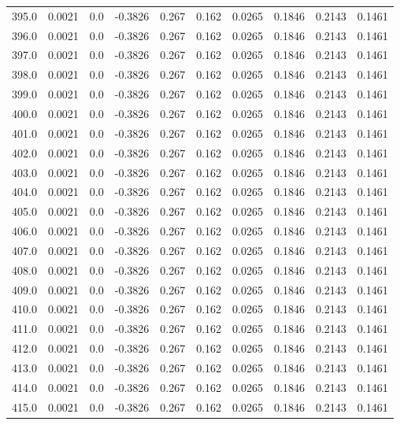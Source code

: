 \begin{longtable}{lrrrrrrrrr}
395.0 & 0.0021 & 0.0 & -0.3826 & 0.267 & 0.162 & 0.0265 & 0.1846 & 0.2143 & 0.1461 \\
396.0 & 0.0021 & 0.0 & -0.3826 & 0.267 & 0.162 & 0.0265 & 0.1846 & 0.2143 & 0.1461 \\
397.0 & 0.0021 & 0.0 & -0.3826 & 0.267 & 0.162 & 0.0265 & 0.1846 & 0.2143 & 0.1461 \\
398.0 & 0.0021 & 0.0 & -0.3826 & 0.267 & 0.162 & 0.0265 & 0.1846 & 0.2143 & 0.1461 \\
399.0 & 0.0021 & 0.0 & -0.3826 & 0.267 & 0.162 & 0.0265 & 0.1846 & 0.2143 & 0.1461 \\
400.0 & 0.0021 & 0.0 & -0.3826 & 0.267 & 0.162 & 0.0265 & 0.1846 & 0.2143 & 0.1461 \\
401.0 & 0.0021 & 0.0 & -0.3826 & 0.267 & 0.162 & 0.0265 & 0.1846 & 0.2143 & 0.1461 \\
402.0 & 0.0021 & 0.0 & -0.3826 & 0.267 & 0.162 & 0.0265 & 0.1846 & 0.2143 & 0.1461 \\
403.0 & 0.0021 & 0.0 & -0.3826 & 0.267 & 0.162 & 0.0265 & 0.1846 & 0.2143 & 0.1461 \\
404.0 & 0.0021 & 0.0 & -0.3826 & 0.267 & 0.162 & 0.0265 & 0.1846 & 0.2143 & 0.1461 \\
405.0 & 0.0021 & 0.0 & -0.3826 & 0.267 & 0.162 & 0.0265 & 0.1846 & 0.2143 & 0.1461 \\
406.0 & 0.0021 & 0.0 & -0.3826 & 0.267 & 0.162 & 0.0265 & 0.1846 & 0.2143 & 0.1461 \\
407.0 & 0.0021 & 0.0 & -0.3826 & 0.267 & 0.162 & 0.0265 & 0.1846 & 0.2143 & 0.1461 \\
408.0 & 0.0021 & 0.0 & -0.3826 & 0.267 & 0.162 & 0.0265 & 0.1846 & 0.2143 & 0.1461 \\
409.0 & 0.0021 & 0.0 & -0.3826 & 0.267 & 0.162 & 0.0265 & 0.1846 & 0.2143 & 0.1461 \\
410.0 & 0.0021 & 0.0 & -0.3826 & 0.267 & 0.162 & 0.0265 & 0.1846 & 0.2143 & 0.1461 \\
411.0 & 0.0021 & 0.0 & -0.3826 & 0.267 & 0.162 & 0.0265 & 0.1846 & 0.2143 & 0.1461 \\
412.0 & 0.0021 & 0.0 & -0.3826 & 0.267 & 0.162 & 0.0265 & 0.1846 & 0.2143 & 0.1461 \\
413.0 & 0.0021 & 0.0 & -0.3826 & 0.267 & 0.162 & 0.0265 & 0.1846 & 0.2143 & 0.1461 \\
414.0 & 0.0021 & 0.0 & -0.3826 & 0.267 & 0.162 & 0.0265 & 0.1846 & 0.2143 & 0.1461 \\
415.0 & 0.0021 & 0.0 & -0.3826 & 0.267 & 0.162 & 0.0265 & 0.1846 & 0.2143 & 0.1461 \\

\end{longtable}
